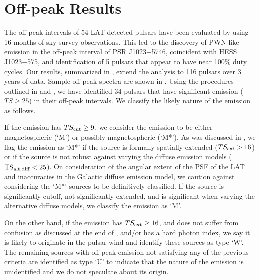 \section{Off-peak Results}

The off-peak intervals of 54 LAT-detected pulsars have
been evaluated by \citet{ackermann_2011a_fermi-lat-search} using 16 months of sky survey observations.  
This led to the discovery of PWN-like emission
in the off-peak interval of PSR J1023$-$5746, coincident with HESS
J1023$-$575, and identification of 5 pulsars that appear to have near 100\%
duty cycles.  Our results, summarized in ,
extend the analysis to 116 pulsars over 3 years of data.  
Sample off-peak spectra are shown in .
Using the procedures outlined in 
and , we have identified 34 pulsars that
have significant emission ($TS\geq25$) in their off-peak intervals.
We classify the likely nature of the emission as follows.

If the emission has $TS_{\rm cut}\geq9$, we consider the emission to be
either magnetospheric (`M') or possibly magnetospheric (`M*').
As was discussed in , 
we flag the emission as `M*' if the source is formally spatially extended
($TS_{\rm ext}>16$) or if the source is not robust against varying
the diffuse emission models ($\mathrm{TS}_{\text{alt,diff}}<25$). 
On consideration of the angular extent of the PSF of the LAT and inaccuracies in the Galactic diffuse
emission model, we caution against considering the `M*' sources to be definitively classified.
If the source is significantly cutoff, not
significantly extended, and is significant when varying the alternative diffuse models,
we classify the emission as `M'.


On the other hand, if the
emission has $TS_{\rm ext}\geq16$, and does not suffer from confusion as
discussed at the end of , and/or has a hard
photon index, we say it is likely
to originate in the pulsar wind and identify these sources as type `W'.
The remaining sources with off-peak emission not satisfying any of the
previous criteria are identified as type `U' to indicate that the nature
of the emission is unidentified and we do not speculate about its origin.


